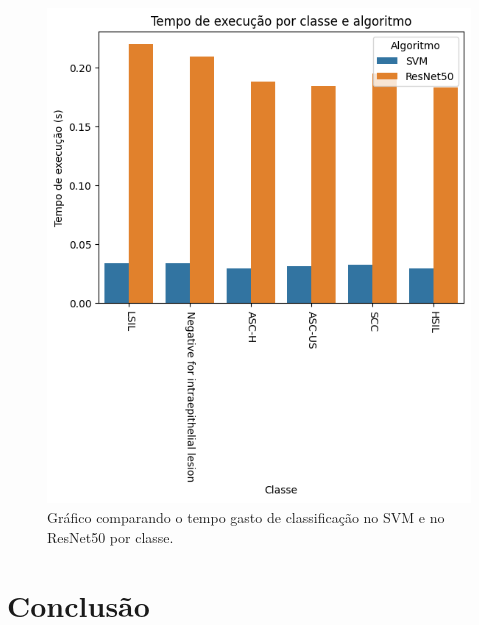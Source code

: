 \documentclass[12pt]{article}
\begin{document}
\begin{figure}
    \centering
    \includegraphics{ResNet50 vs SVM por classe.png}
    \caption{Gráfico comparando o tempo gasto de classificação no SVM e no ResNet50 por classe.}
    \label{fig:grafico-svm-vs-resnet-tempo-por-classe}
\end{figure}

\section{Conclusão}

\nocite{cancerCervical}
\nocite{coloracaoPapanicolau}
\nocite{papanicolauStain}
\nocite{resnet}
\nocite{svm}



\end{document}
